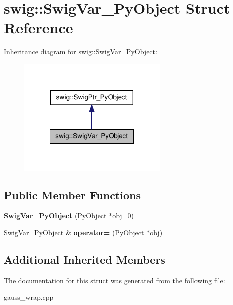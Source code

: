 \hypertarget{structswig_1_1_swig_var___py_object}{\section{swig\-:\-:Swig\-Var\-\_\-\-Py\-Object Struct Reference}
\label{structswig_1_1_swig_var___py_object}
}


Inheritance diagram for swig\-:\-:Swig\-Var\-\_\-\-Py\-Object\-:\nopagebreak
\begin{figure}[H]
\begin{center}
\leavevmode
\includegraphics[width=204pt]{structswig_1_1_swig_var___py_object__inherit__graph}
\end{center}
\end{figure}
\subsection*{Public Member Functions}
\begin{DoxyCompactItemize}
\item 
\hypertarget{structswig_1_1_swig_var___py_object_a2b61f843215bceaff8ec2ea6e92d46c2}{{\bfseries Swig\-Var\-\_\-\-Py\-Object} (Py\-Object $\ast$obj=0)}\label{structswig_1_1_swig_var___py_object_a2b61f843215bceaff8ec2ea6e92d46c2}

\item 
\hypertarget{structswig_1_1_swig_var___py_object_a7e6053b64cf6e787b99a67b09cdc6d89}{\hyperlink{structswig_1_1_swig_var___py_object}{Swig\-Var\-\_\-\-Py\-Object} \& {\bfseries operator=} (Py\-Object $\ast$obj)}\label{structswig_1_1_swig_var___py_object_a7e6053b64cf6e787b99a67b09cdc6d89}

\end{DoxyCompactItemize}
\subsection*{Additional Inherited Members}


The documentation for this struct was generated from the following file\-:\begin{DoxyCompactItemize}
\item 
gauss\-\_\-wrap.\-cpp\end{DoxyCompactItemize}
